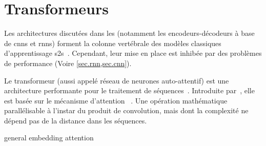 \section{Transformeurs}

Les architectures discutées dans les 
(notamment les encodeurs-décodeurs à base de \glspl{cnn} et \glspl{rnn}) 
forment la colonne vertébrale des modèles classiques d'apprentissage \gls{s2s}~\cite{deep-nmt-survey}.
Cependant, leur mise en place est inhibée par des problèmes de performance 
(Voire \cref{sec.rnn,sec.cnn}).

Le transformeur (aussi appelé réseau de neurones auto-attentif) est une architecture performante pour le traitement de séquences~\cite{Shim_Sung_2022}.
Introduite par~\cite{attention}, elle est basée sur le mécanisme d'attention%
~\cite{Bahdanau_Cho_Bengio_2016}.
Une opération mathématique parallélisable à l'instar du produit de convolution, 
mais dont la complexité ne dépend pas de la distance dans les séquences.



{general}
{embedding}
{attention}